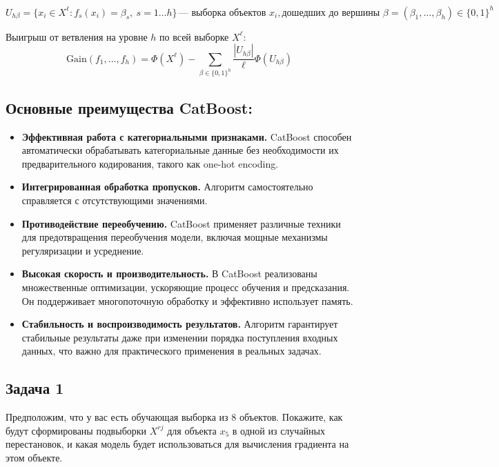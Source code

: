 $$
U_{h\beta} = \{x_i \in X^\ell : f_s(x_i) = \beta_s, \ s = 1 \ldots h\} \, \text{— выборка объектов } x_i,
\text{дошедших до вершины } \beta = (\beta_1, \ldots, \beta_h) \in \{0,1\}^h
$$

Выигрыш от ветвления на уровне \(h\) по всей выборке \(X^\ell\):
$$
\text{Gain}(f_1, \ldots, f_h) = \Phi(X^\ell) - \sum_{\beta \in \{0,1\}^h} \frac{|U_{h\beta}|}{\ell} \Phi(U_{h\beta})
$$

\subsection*{Основные преимущества CatBoost:}

\begin{itemize}
    \item \textbf{Эффективная работа с категориальными признаками.} CatBoost способен автоматически обрабатывать категориальные данные без необходимости их предварительного кодирования, такого как one-hot encoding.

    \item \textbf{Интегрированная обработка пропусков.} Алгоритм самостоятельно справляется с отсутствующими значениями.
    \item \textbf{Противодействие переобучению.} CatBoost применяет различные техники для предотвращения переобучения модели, включая мощные механизмы регуляризации и усреднение.

    \item \textbf{Высокая скорость и производительность.} В CatBoost реализованы множественные оптимизации, ускоряющие процесс обучения и предсказания. Он поддерживает многопоточную обработку и эффективно использует память.

    \item \textbf{Стабильность и воспроизводимость результатов.} Алгоритм гарантирует стабильные результаты даже при изменении порядка поступления входных данных, что важно для практического применения в реальных задачах.

\end{itemize}

\subsection*{Задача 1}

Предположим, что у вас есть обучающая выборка из 8 объектов. Покажите, как будут сформированы подвыборки $X^{rj} $ для объекта $x_5$ в одной из случайных перестановок, и какая модель будет использоваться для вычисления градиента на этом объекте.

